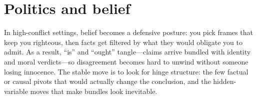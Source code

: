 \part{Politics and belief}
\epigraph{In high-conflict settings, belief becomes a defensive posture: you pick frames that keep you righteous, then facts get filtered by what they would obligate you to admit. As a result, ``is'' and ``ought'' tangle---claims arrive bundled with identity and moral verdicts---so disagreement becomes hard to unwind without someone losing innocence. The stable move is to look for hinge structure: the few factual or causal pivots that would actually change the conclusion, and the hidden-variable moves that make bundles look inevitable.}{}
\clearpage
